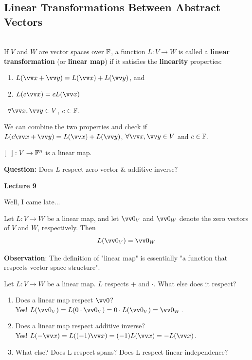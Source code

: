 \subsection{Linear Transformations Between Abstract Vectors}

\begin{definition}
    \phantom{}\\
    If $V$ and $W$ are vector spaces over ${\mathbb{F}}$, a function $L:V\to W$ is called a \textbf{linear transformation}
    (or \textbf{linear map}) if it satisfies the \textbf{linearity} properties:
    \begin{enumerate}
        \item $L(\vx + \vy) = L(\vx) + L(\vy)$, and
        \item $L(c\vx) = cL(\vx)$
    \end{enumerate}
    \ $\forall \vx, \vy \in V$, $c \in {\mathbb{F}}$.
\end{definition}

\begin{remark}
    \phantom{}
    We can combine the two properties and check if $L(c\vx + \vy) = L(\vx) + L(\vy)$, $\forall \vx,\vy \in V$ and $c \in {\mathbb{F}}$.
\end{remark}

\begin{example}
    $\left[ \phantom{A} \right]:V\to {\mathbb{F}}^n$ is a linear map. 
\end{example}

\textbf{Question:} Does $L$ respect zero vector \& additive inverse?

\makebox[\linewidth]{\hrulefill}
{\large \textbf{Lecture 9}}

Well, I came late...

\begin{proposition}
    Let $L:V\to W$ be a linear map, and let $\vzero_V$ and $\vzero_W$ denote the zero vectors of $V$ and $W$, respectively.
    Then \[L(\vzero_V) = \vzero_W\]
\end{proposition}

\textbf{Observation}: The definition of "linear map" is essentially "a function that respects vector space structure".

Let $L:V\to W$ be a linear map. $L$ respects $+$ and $\cdot$. What else does it respect?
\begin{enumerate}[label=(\alph*)]
    \item Does a linear map respect $\vzero$? \\
    Yes! $L(\vzero_V) = L(0\cdot \vzero_V) = 0 \cdot L(\vzero_V) = \vzero_W$.
    \item Does a linear map respect additive inverse? \\
    Yes! $L(-\vx) = L((-1)\vx) = (-1)L(\vx) = -L(\vx)$.
    \item What else? Does L respect spans? Does L respect linear independence?
\end{enumerate}

